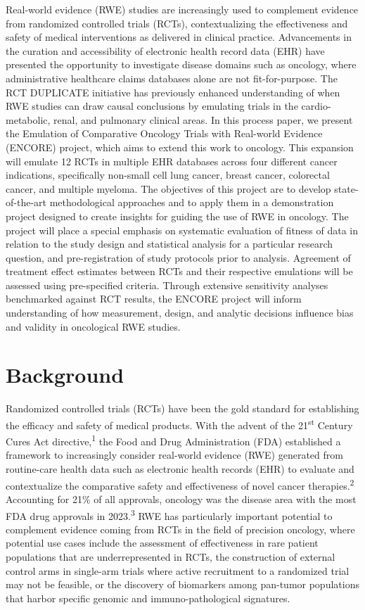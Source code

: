\documentclass[
  letterpaper,
  DIV=11,
  numbers=noendperiod]{scrartcl}
\begin{document}
Real-world evidence (RWE) studies are increasingly used to complement
evidence from randomized controlled trials (RCTs), contextualizing the
effectiveness and safety of medical interventions as delivered in
clinical practice. Advancements in the curation and accessibility of
electronic health record data (EHR) have presented the opportunity to
investigate disease domains such as oncology, where administrative
healthcare claims databases alone are not fit-for-purpose. The RCT
DUPLICATE initiative has previously enhanced understanding of when RWE
studies can draw causal conclusions by emulating trials in the
cardio-metabolic, renal, and pulmonary clinical areas. In this process
paper, we present the Emulation of Comparative Oncology Trials with
Real-world Evidence (ENCORE) project, which aims to extend this work to
oncology. This expansion will emulate 12 RCTs in multiple EHR databases
across four different cancer indications, specifically non-small cell
lung cancer, breast cancer, colorectal cancer, and multiple myeloma. The
objectives of this project are to develop state-of-the-art
methodological approaches and to apply them in a demonstration project
designed to create insights for guiding the use of RWE in oncology. The
project will place a special emphasis on systematic evaluation of
fitness of data in relation to the study design and statistical analysis
for a particular research question, and pre-registration of study
protocols prior to analysis. Agreement of treatment effect estimates
between RCTs and their respective emulations will be assessed using
pre-specified criteria. Through extensive sensitivity analyses
benchmarked against RCT results, the ENCORE project will inform
understanding of how measurement, design, and analytic decisions
influence bias and validity in oncological RWE studies.

\newpage{}

\section{Background}\label{background}

Randomized controlled trials (RCTs) have been the gold standard for
establishing the efficacy and safety of medical products. With the
advent of the 21\textsuperscript{st} Century Cures Act
directive,\textsuperscript{1} the Food and Drug Administration (FDA)
established a framework to increasingly consider real-world evidence
(RWE) generated from routine-care health data such as electronic health
records (EHR) to evaluate and contextualize the comparative safety and
effectiveness of novel cancer therapies.\textsuperscript{2} Accounting
for 21\% of all approvals, oncology was the disease area with the most
FDA drug approvals in 2023.\textsuperscript{3} RWE has particularly
important potential to complement evidence coming from RCTs in the field
of precision oncology, where potential use cases include the assessment
of effectiveness in rare patient populations that are underrepresented
in RCTs, the construction of external control arms in single-arm trials
where active recruitment to a randomized trial may not be feasible, or
the discovery of biomarkers among pan-tumor populations that harbor
specific genomic and immuno-pathological signatures.
\end{document}
